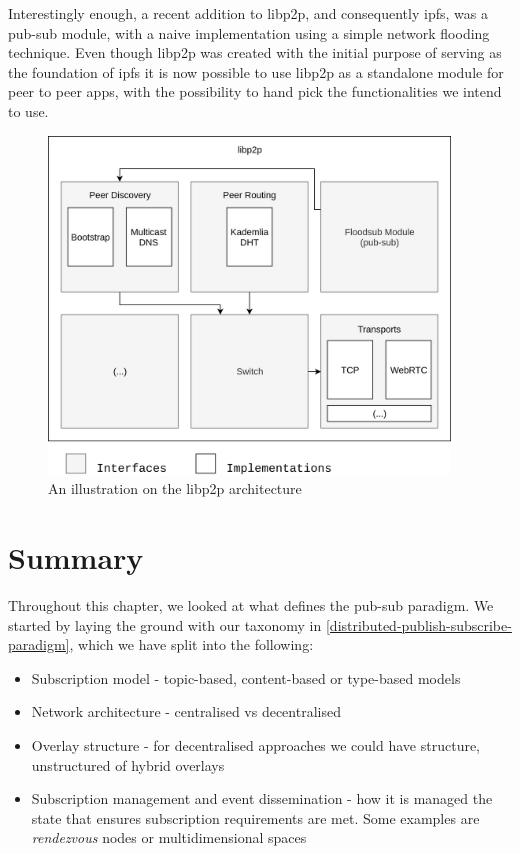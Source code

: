 Interestingly enough, a recent addition to libp2p, and consequently \acrshort{ipfs}, was a
pub-sub module, with a naive implementation using a simple network flooding
technique. Even though libp2p was created with the initial purpose of serving
as the foundation of \acrshort{ipfs} it is now possible to use libp2p as a standalone
module for peer to peer apps, with the possibility to hand pick the
functionalities we intend to use.

\begin{figure}[hb!]
  \centering
  \includegraphics[width=0.95\textwidth]{img/libp2p-arch.png}
  \caption{An illustration on the libp2p architecture}
  \label{fig:ipfs-arch}
\end{figure}

\section{Summary}\label{summary}

Throughout this chapter, we looked at what defines the pub-sub paradigm. We
started by laying the ground with our taxonomy in
\ref{distributed-publish-subscribe-paradigm}, which we have split into the
following:

\begin{itemize}
  \item
    Subscription model - topic-based, content-based or type-based models
  \item
    Network architecture - centralised vs decentralised
  \item
    Overlay structure - for decentralised approaches we could have structure,
    unstructured of hybrid overlays
  \item
    Subscription management and event dissemination - how it is managed the state that ensures subscription requirements are met. Some examples are \emph{rendezvous} nodes or multidimensional spaces
\end{itemize}


